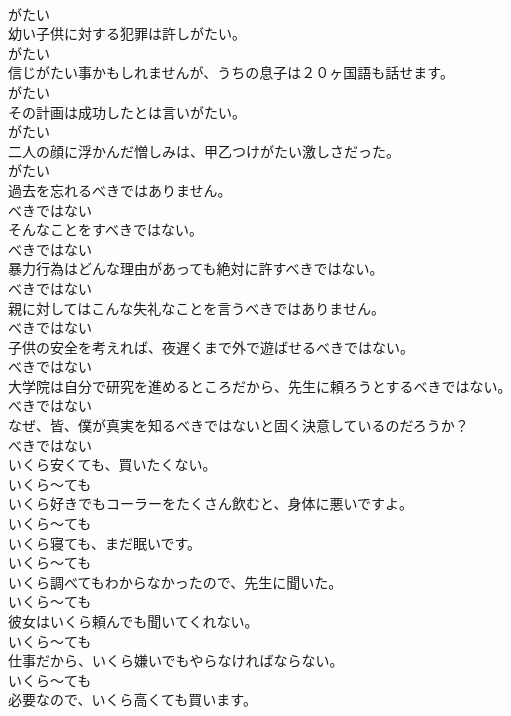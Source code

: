 \documentclass[8pt]{extreport}
\begin{document}
\begin{CJK}{UTF8}{min}
\\	がたい
\\	幼い子供に対する犯罪は許しがたい。	
\\	がたい
\\	信じがたい事かもしれませんが、うちの息子は２０ヶ国語も話せます。	
\\	がたい
\\	その計画は成功したとは言いがたい。	
\\	がたい
\\	二人の顔に浮かんだ憎しみは、甲乙つけがたい激しさだった。	
\\	がたい
\\	過去を忘れるべきではありません。	
\\	べきではない
\\	そんなことをすべきではない。	
\\	べきではない
\\	暴力行為はどんな理由があっても絶対に許すべきではない。	
\\	べきではない
\\	親に対してはこんな失礼なことを言うべきではありません。	
\\	べきではない
\\	子供の安全を考えれば、夜遅くまで外で遊ばせるべきではない。	
\\	べきではない
\\	大学院は自分で研究を進めるところだから、先生に頼ろうとするべきではない。	
\\	べきではない
\\	なぜ、皆、僕が真実を知るべきではないと固く決意しているのだろうか？	
\\	べきではない
\\	いくら安くても、買いたくない。	
\\	いくら～ても
\\	いくら好きでもコーラーをたくさん飲むと、身体に悪いですよ。	
\\	いくら～ても
\\	いくら寝ても、まだ眠いです。	
\\	いくら～ても
\\	いくら調べてもわからなかったので、先生に聞いた。	
\\	いくら～ても
\\	彼女はいくら頼んでも聞いてくれない。	
\\	いくら～ても
\\	仕事だから、いくら嫌いでもやらなければならない。	
\\	いくら～ても
\\	必要なので、いくら高くても買います。	

\end{CJK}
\end{document}
